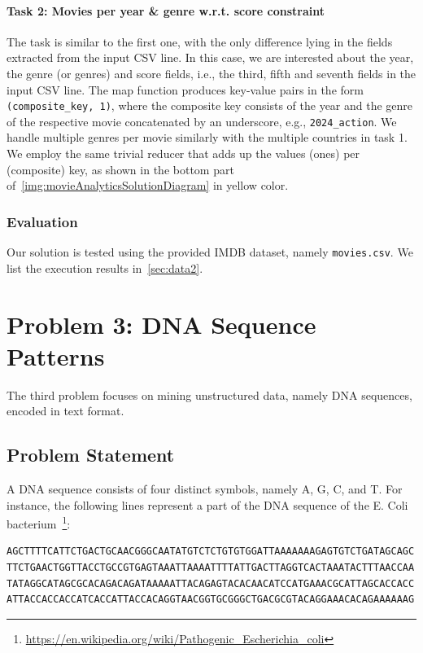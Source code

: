 \documentclass[acmlarge]{acmart}
\begin{document}
\paragraph{Task 2: Movies per year \& genre w.r.t. score constraint} The task is similar to the first one, with the only difference lying in the fields extracted from the input CSV line. In this case, we are interested about the year, the genre (or genres) and score fields, i.e., the third, fifth and seventh fields in the input CSV line. The map function produces key-value pairs in the form \texttt{(composite\_key, 1)}, where the composite key consists of the year and the genre of the respective movie concatenated by an underscore, e.g., \texttt{2024\_action}. We handle multiple genres per movie similarly with the multiple countries in task 1. We employ the same trivial reducer that adds up the values (ones) per (composite) key, as shown in the bottom part of~\autoref{img:movieAnalyticsSolutionDiagram} in yellow color.

\subsubsection{Evaluation} Our solution is tested using the provided IMDB dataset, namely \texttt{movies.csv}. We list the execution results in~\autoref{sec:data2}.

\section{Problem 3: DNA Sequence Patterns}
\label{sec:problem3}
The third problem focuses on mining unstructured data, namely DNA sequences, encoded in text format.


\subsection{Problem Statement}
A DNA sequence consists of four distinct symbols, namely A, G, C, and T. For instance, the following lines represent a part of the DNA sequence of the E. Coli bacterium~\footnote{\href{https://en.wikipedia.org/wiki/Pathogenic_Escherichia_coli}{https://en.wikipedia.org/wiki/Pathogenic\_Escherichia\_coli}}:

\begin{verbatim}
AGCTTTTCATTCTGACTGCAACGGGCAATATGTCTCTGTGTGGATTAAAAAAAGAGTGTCTGATAGCAGC
TTCTGAACTGGTTACCTGCCGTGAGTAAATTAAAATTTTATTGACTTAGGTCACTAAATACTTTAACCAA
TATAGGCATAGCGCACAGACAGATAAAAATTACAGAGTACACAACATCCATGAAACGCATTAGCACCACC
ATTACCACCACCATCACCATTACCACAGGTAACGGTGCGGGCTGACGCGTACAGGAAACACAGAAAAAAG
\end{verbatim}
\end{document}
